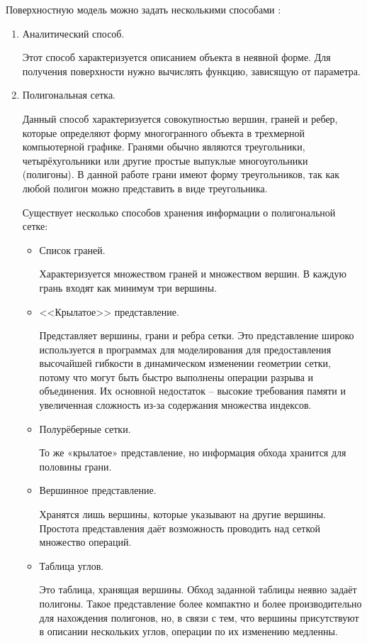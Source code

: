 Поверхностную модель можно задать несколькими способами \cite{geometry} :
\begin{enumerate}[label=\arabic*)]
	\item Аналитический способ. 
	
	Этот способ характеризуется описанием объекта в неявной форме. Для получения поверхности нужно вычислять функцию, зависящую от параметра.
	
	\item Полигональная сетка. 
	
	Данный способ характеризуется совокупностью вершин, граней и ребер, которые определяют форму многогранного объекта в трехмерной компьютерной графике. Гранями обычно являются треугольники, четырёхугольники или другие простые выпуклые многоугольники (полигоны). В данной работе грани имеют форму треугольников, так как любой полигон можно представить в виде треугольника.
	
	Существует несколько способов хранения информации о полигональной сетке:
	\begin{itemize}
		\item Список граней. 
		
		Характеризуется множеством граней и множеством вершин. В каждую грань входят как минимум три вершины. 
		\item <<Крылатое>> представление. 
		
		Представляет вершины, грани и ребра сетки. Это представление широко используется в программах для моделирования для предоставления высочайшей гибкости в динамическом изменении геометрии сетки, потому что могут быть быстро выполнены операции разрыва и объединения. Их основной недостаток -- высокие требования памяти и увеличенная сложность из-за содержания множества индексов.
		
		\item Полурёберные сетки.
		
		То же «крылатое» представление, но информация обхода хранится для половины грани.
		
		\item Вершинное представление. 
		
	Хранятся лишь вершины, которые указывают на другие вершины.
Простота представления даёт возможность проводить над сеткой множество операций.
		\item Таблица углов.

        Это таблица, хранящая вершины. Обход заданной таблицы неявно задаёт полигоны. Такое представление более компактно и более производительно для нахождения полигонов, но, в связи с тем, что вершины присутствуют в описании нескольких углов, операции по их изменению медленны.
	\end{itemize}
\end{enumerate}


